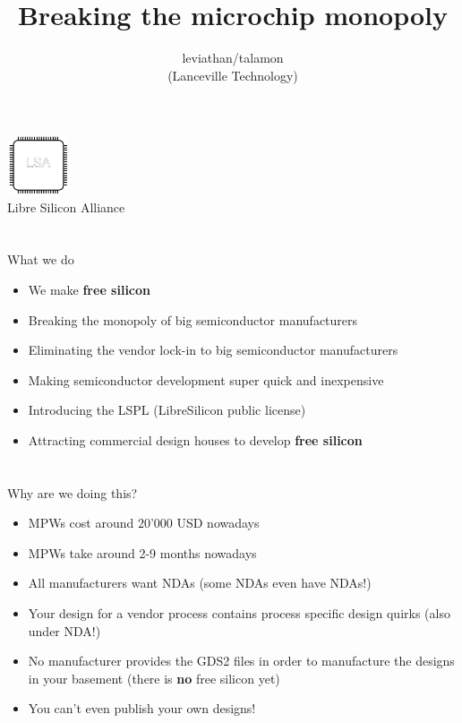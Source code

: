\documentclass[9pt]{beamer}
\author{leviathan/talamon\\(Lanceville Technology)}
\title{Breaking the microchip monopoly}
\begin{document}
\begin{frame}
	\titlepage
	\begin{center}
		\includegraphics[width=50pt,height=50pt]{lsa.png}
		\\ Libre Silicon Alliance
	\end{center}
\end{frame}


\section[What]{}
\begin{frame}{What we do}
	\begin{itemize}
        \setlength\itemsep{1em}
		\item We make \textbf{free silicon}
		\item Breaking the monopoly of big semiconductor manufacturers
		\item Eliminating the vendor lock-in to big semiconductor manufacturers
		\item Making semiconductor development super quick and inexpensive
		\item Introducing the LSPL (LibreSilicon public license)
		\item Attracting commercial design houses to develop \textbf{free silicon}
	\end{itemize}
\end{frame}

\section[Why]{}
\begin{frame}{Why are we doing this?}
	\begin{itemize}
		\item MPWs cost around 20'000 USD nowadays
		\item MPWs take around 2-9 months nowadays
		\item All manufacturers want NDAs (some NDAs even have NDAs!)
		\item Your design for a vendor process contains process specific design quirks (also under NDA!)
		\item No manufacturer provides the GDS2 files in order to manufacture the designs in your basement (there is \textbf{no} free silicon yet)
		\item You can't even publish your own designs!
	\end{itemize}
\end{frame}
\end{document}
